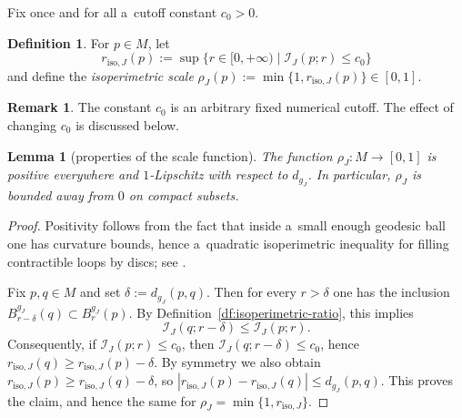 \documentclass[pdftex]{sigma}
\numberwithin{equation}{section}
\newtheorem{lm}[Theorem]{Lemma}
\theoremstyle{definition}
\newtheorem{df}[Theorem]{Definition}
\newtheorem{rem}[Theorem]{Remark}
\begin{document}
Fix once and for all a~cutoff constant $c_0>0$.

\begin{df}\label{df:isoperimetric-scale}
For $p\in M$, let
\[
r_{\mathrm{iso},J}(p)
:=
\sup\{r\in[0,+\infty) \mid \mathcal{I}_J(p;r)\le c_0\}
\]
and define the \emph{isoperimetric scale}
$
\rho_J(p):=\min\{1,r_{\mathrm{iso},J}(p)\}\in[0,1]$.
\end{df}
\begin{rem}\label{rem:cutoff}
The constant $c_0$ is an arbitrary fixed numerical cutoff. The effect of changing $c_0$ is discussed below.
\end{rem}

\begin{lm}[properties of the scale function]\label{lem:rho-continuous}
The function $\rho_J\colon M\to[0,1]$ is positive everywhere and $1$-Lipschitz with respect to $d_{g_J}$.
In particular, $\rho_J$ is bounded away from $0$ on compact subsets.
\end{lm}
\begin{proof}
 Positivity follows from the fact that inside a~small enough geodesic ball one has curvature bounds, hence a~quadratic isoperimetric inequality for filling contractible loops by discs; see \cite[Theorem~4.4.1]{McDuffSalamonJHol}.

Fix $p,q\in M$ and set $\delta:=d_{g_J}(p,q)$. Then for every $r>\delta$ one has the inclusion $B^{g_J}_{r-\delta}(q)\subset B^{g_J}_{r}(p)$. By Definition~\ref{df:isoperimetric-ratio}, this implies
 \[
 \mathcal{I}_J(q;r-\delta) \le \mathcal{I}_J(p;r).
 \]
 Consequently, if $\mathcal{I}_J(p;r)\le c_0$, then $\mathcal{I}_J(q;r-\delta)\le c_0$, hence
 $
 r_{\mathrm{iso},J}(q)\ge r_{\mathrm{iso},J}(p)-\delta.
 $
 By symmetry we also obtain $r_{\mathrm{iso},J}(p)\ge r_{\mathrm{iso},J}(q)-\delta$, so
 $
 |r_{\mathrm{iso},J}(p)-r_{\mathrm{iso},J}(q)|\le d_{g_J}(p,q).
 $
 This proves the claim, and hence the same for $\rho_J=\min\{1,r_{\mathrm{iso},J}\}$.
 \end{proof}
\end{document}
